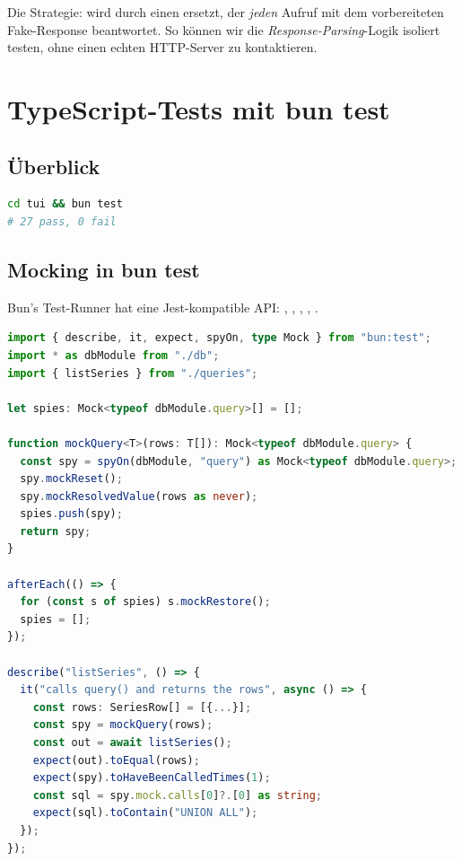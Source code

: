 Die Strategie:  wird durch einen 
ersetzt, der \emph{jeden} Aufruf mit dem vorbereiteten Fake-Response
beantwortet. So können wir die \emph{Response-Parsing}-Logik
isoliert testen, ohne einen echten HTTP-Server zu kontaktieren.

\section{TypeScript-Tests mit bun test}

\subsection{Überblick}

\begin{lstlisting}[language=bash, caption={TUI-Tests laufen}]
cd tui && bun test
# 27 pass, 0 fail
\end{lstlisting}

\subsection{Mocking in bun test}

Bun's Test-Runner hat eine Jest-kompatible API:
, , , , .

\begin{lstlisting}[language=typescript, caption={Mocking der pg-Layer im TUI},label=lst:bun-mock]
import { describe, it, expect, spyOn, type Mock } from "bun:test";
import * as dbModule from "./db";
import { listSeries } from "./queries";

let spies: Mock<typeof dbModule.query>[] = [];

function mockQuery<T>(rows: T[]): Mock<typeof dbModule.query> {
  const spy = spyOn(dbModule, "query") as Mock<typeof dbModule.query>;
  spy.mockReset();
  spy.mockResolvedValue(rows as never);
  spies.push(spy);
  return spy;
}

afterEach(() => {
  for (const s of spies) s.mockRestore();
  spies = [];
});

describe("listSeries", () => {
  it("calls query() and returns the rows", async () => {
    const rows: SeriesRow[] = [{...}];
    const spy = mockQuery(rows);
    const out = await listSeries();
    expect(out).toEqual(rows);
    expect(spy).toHaveBeenCalledTimes(1);
    const sql = spy.mock.calls[0]?.[0] as string;
    expect(sql).toContain("UNION ALL");
  });
});
\end{lstlisting}

